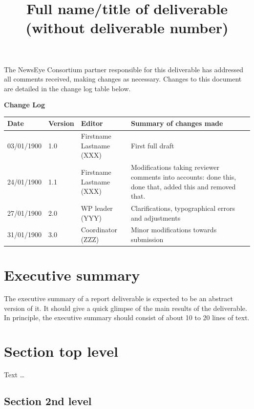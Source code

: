 \documentclass{newseye_del}
\title{Full name/title of deliverable (without deliverable number)}
\begin{document}
\titlepage

The NewsEye Consortium partner responsible for this deliverable has
addressed all comments received, making changes as necessary.
Changes to this document are detailed in the change log table below.

\textbf{Change Log}\\[5pt]
\begin{tabular}{ |p{2.1cm}|p{1.2cm}|p{3.8cm}|p{7.06cm}|  }
 \hline
 \rowcolor{lightgray} Date & Version & Editor & Summary of changes made\\
 \hline
 03/01/1900 & 1.0 & \makecell{Firstname Lastname \\ (XXX)} & First full draft\\
 \hline
 24/01/1900 & 1.1 & \makecell{Firstname Lastname \\ (XXX)} & Modifications taking reviewer comments into accounts: done this, done that, added this and removed that.\\
 \hline
 27/01/1900 & 2.0 & \makecell{WP leader \\ (YYY)} & Clarifications, typographical errors and adjustments\\
 \hline
 31/01/1900 & 3.0 & \makecell{Coordinator \\ (ZZZ)} & Minor modifications towards submission\\
 \hline
\end{tabular}



\newpage
\section*{Executive summary}

The executive summary of a report deliverable is expected to be an
abstract version of it. It should give a quick glimpse of the main
results of the deliverable. In principle, the executive summary
should consist of about 10 to 20 lines of text.

\tableofcontents
\newpage


\section{Section top level}

Text \dots

\subsection{Section 2nd level}
\label{sec:example subsection}
\end{document}
